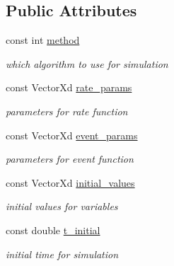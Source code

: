 \subsection*{Public Attributes}
\begin{DoxyCompactItemize}
\item 
\mbox{\label{class_paramset_a67376577973f825ba60fc7c319ccc906}} 
const int \hyperlink{class_paramset_a67376577973f825ba60fc7c319ccc906}{method}
\begin{DoxyCompactList}\small\item\em which algorithm to use for simulation \end{DoxyCompactList}\item 
\mbox{\label{class_paramset_a0bde34e534a67451a5e9317c9a1c8a81}} 
const Vector\+Xd \hyperlink{class_paramset_a0bde34e534a67451a5e9317c9a1c8a81}{rate\+\_\+params}
\begin{DoxyCompactList}\small\item\em parameters for rate function \end{DoxyCompactList}\item 
\mbox{\label{class_paramset_a25079a96917e88458073dedd724f2b68}} 
const Vector\+Xd \hyperlink{class_paramset_a25079a96917e88458073dedd724f2b68}{event\+\_\+params}
\begin{DoxyCompactList}\small\item\em parameters for event function \end{DoxyCompactList}\item 
\mbox{\label{class_paramset_ad7db1c48bae63ad5b392a7b4de9f5d56}} 
const Vector\+Xd \hyperlink{class_paramset_ad7db1c48bae63ad5b392a7b4de9f5d56}{initial\+\_\+values}
\begin{DoxyCompactList}\small\item\em initial values for variables \end{DoxyCompactList}\item 
\mbox{\label{class_paramset_a7d82a76c08567e5072aa1b125708c7d8}} 
const double \hyperlink{class_paramset_a7d82a76c08567e5072aa1b125708c7d8}{t\+\_\+initial}
\begin{DoxyCompactList}\small\item\em initial time for simulation \end{DoxyCompactList}\item 

\end{DoxyCompactItemize}
